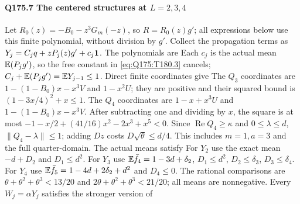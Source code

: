 \paragraph{Q175.7 The centered structures at $L=\allowbreak 2,\allowbreak 3,\allowbreak 4$}\label{part:Q175.7}
Let $R_0(z)=\allowbreak -B_0-z^3G_m(-z)$, so $R=\allowbreak R_0(z)g'$; all expressions
below use this finite polynomial, without division by $g'$.
Collect the propagation terms as $Y_j=\allowbreak C_jq+zP_j(z)g'+c_j\mathbf1$.
The polynomials are
Each $c_j$ is the actual mean $\mathbb E(P_jg')$, so the free constant in
\eqref{eq:Q175:T180.3} cancels; $C_j+\mathbb E(P_jg')=\allowbreak \mathbb E Y_{j-1}\le\allowbreak 1$.
Direct finite coordinates give
The $Q_3$ coordinates are $1-(1-B_0)x-x^3V$ and $1-x^2U$;
they are positive and their squared bound is
$(1-3x/4)^2+x\le\allowbreak 1$.
The $Q_4$ coordinates are $1-x+x^3U$ and $1-(1-B_0)x-x^3V$.
After subtracting one and dividing by $x$, the square is at most
$-1-x/2+(41/16)x^2-2x^3+x^5<\allowbreak 0$.
Since $\operatorname{Re}Q_4\ge\allowbreak \kappa$ and $0\le\allowbreak \lambda\le\allowbreak  d$,
$\|Q_4-\lambda\|\le\allowbreak 1$; adding $Dz$ costs
$D\sqrt\theta\le\allowbreak  d/4$. This includes $m=\allowbreak 1,\allowbreak a=\allowbreak 3$ and the full quarter-domain.
The actual means satisfy
For $Y_2$ use the exact mean $-d+D_2$ and $D_1\le\allowbreak  d^2$.
For $Y_3$ use $\mathbb E\bar f_4=\allowbreak 1-3d+\delta_2$,
$D_1\le\allowbreak  d^2$, $D_2\le\allowbreak \delta_3$, $D_3\le\allowbreak \delta_4$.
For $Y_4$ use $\mathbb E\bar f_5=\allowbreak 1-4d+2\delta_2+d^2$ and $D_4\le\allowbreak 0$.
The rational comparisons are $\theta+\theta^2+\theta^3<\allowbreak 13/20$
and $2\theta+\theta^2+\theta^3<\allowbreak 21/20$; all means are nonnegative.
Every $W_j=\allowbreak \alpha Y_j$ satisfies the stronger version of
